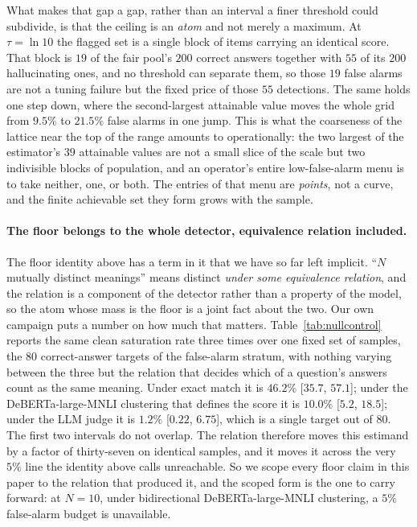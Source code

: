 What makes that gap a gap, rather than an interval a finer threshold could subdivide, is that
the ceiling is an \emph{atom} and not merely a maximum. At $\tau{=}\ln 10$ the flagged set is
a single block of items carrying an identical score. That block is
$19$ of the fair pool's $200$ correct answers together
with $55$ of its $200$ hallucinating ones, and no threshold can separate them, so those
$19$ false alarms are not a tuning failure but the fixed price of those $55$ detections. The
same holds one step down, where the second-largest attainable value moves the whole grid from
$9.5\%$ to $21.5\%$ false alarms in one jump. This is what the coarseness of the lattice near
the top of the range amounts to operationally: the two largest of the estimator's $39$
attainable values are not a small slice of the scale but two indivisible blocks of
population, and an operator's entire low-false-alarm menu is to take neither, one, or both.
The entries of that menu are \emph{points}, not a curve, and the finite achievable set they
form grows with the sample.

\paragraph{The floor belongs to the whole detector, equivalence relation included.}
The floor identity above has a term in it that we have so far left implicit. ``$N$ mutually
distinct meanings'' means distinct \emph{under some equivalence relation}, and the relation
is a component of the detector rather than a property of the model, so the atom whose mass
is the floor is a joint fact about the two. Our own campaign puts a number on how much that
matters. Table~\ref{tab:nullcontrol} reports the same clean saturation rate three times over
one fixed set of samples, the $80$ correct-answer targets of the false-alarm stratum, with
nothing varying between the three but the relation that decides which of a question's
answers count as the same meaning. Under exact match it is $46.2\%$ [$35.7$, $57.1$]; under
the DeBERTa-large-MNLI clustering that defines the score it is $10.0\%$ [$5.2$, $18.5$];
under the LLM judge it is $1.2\%$ [$0.22$, $6.75$], which is a single target out of $80$. The
first two intervals do not overlap. The relation therefore moves this estimand by a factor of
thirty-seven on identical samples, and it moves it across the very $5\%$ line the identity
above calls unreachable. So we scope every floor claim in this paper to the relation that
produced it, and the scoped form is the one to carry forward: at $N{=}10$, under
bidirectional DeBERTa-large-MNLI clustering, a $5\%$ false-alarm budget is unavailable.

